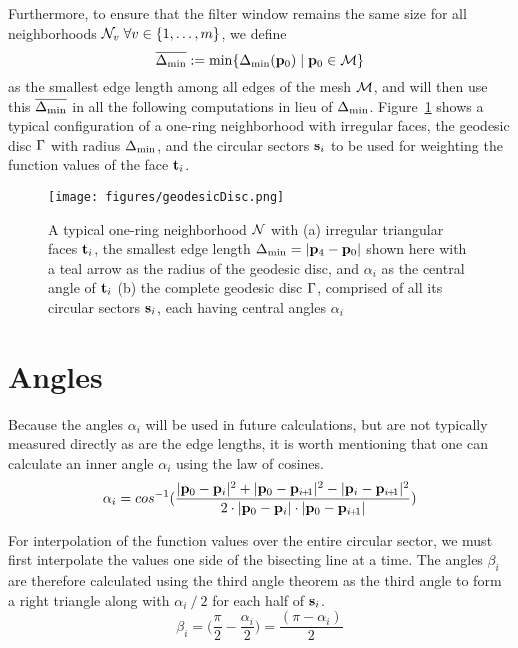 Furthermore, to ensure that the filter window remains the same size for all neighborhoods $\mathcal{N}_v\;\forall v \in \{1,\ldots,m\}$, we define
\begin{equation}
	\overline{\Delta_\text{min}} := \min\{\Delta_\text{min}(\mathbf{p}_0) \;|\; \mathbf{p}_0 \in \mathcal{M}\}
	\label{eq:globalMinimumEdgeLength}
\end{equation}%
%
as the smallest edge length among all edges of the mesh $\mathcal{M}$, and will then use this $\overline{\Delta_\text{min}}$ in all the following computations in lieu of $\Delta_\text{min}$.
%
Figure~\ref{fig:geodesicDisc} shows a typical configuration of a one-ring neighborhood with irregular faces, the geodesic disc $\Gamma$ with radius $\Delta_\text{min}$, and the circular sectors $\mathbf{s}_i$ to be used for weighting the function values of the face $\mathbf{t}_i$.
\begin{figure}[ht]
\ffigbox
	{\texttt{[image: figures/geodesicDisc.png]}}
	{\caption[One-ring and geodesic disc]{A typical one-ring neighborhood $\mathcal{N}$ with (a) irregular triangular faces $\mathbf{t}_i$, the smallest edge length $\Delta_\text{min} = |\mathbf{p}_4 - \mathbf{p}_0|$ shown here with a teal arrow as the radius of the geodesic disc, and $\alpha_i$ as the central angle of $\mathbf{t}_i$ (b) the complete geodesic disc $\Gamma$, comprised of all its circular sectors $\mathbf{s}_i$, each having central angles $\alpha_i$}\label{fig:geodesicDisc}}
\end{figure}%
%
%
%
%
\section{Angles}
\label{cFONSsA}
Because the angles $\alpha_i$ will be used in future calculations, but are not typically measured directly as are the edge lengths, it is worth mentioning that one can calculate an inner angle $\alpha_i$ using the law of cosines. 
\begin{equation}
	\alpha_i = cos^{-1}(\frac{|\bp_0 - \bp_{i}|^2 + |\bp_0 - \bp_{\sipo}|^2 - |\bp_i - \bp_{\sipo}|^2}{2\cdot|\bp_0 - \bp_{i}|\cdot|\bp_0 - \bp_{\sipo}|})
	\label{eq:alphaFromEdgeLengths}
\end{equation}%
%

For interpolation of the function values over the entire circular sector, we must first interpolate the values one side of the bisecting line at a time. The angles $\beta_i$ are therefore calculated using the third angle theorem as the third angle to form a right triangle along with $\alpha_i\mathbin{/}2$ for each half of $\mathbf{s}_i$. 
\begin{equation}
	\beta_i = \Big(\frac{\pi}{2} - \frac{\alpha_i}{2}\Big) = \frac{(\pi - \alpha_i)}{2}
	\label{eq:betaFromHalfAlpha}
\end{equation}%
%
%
